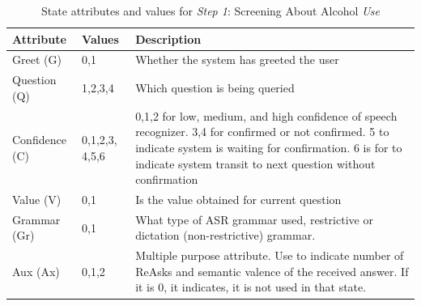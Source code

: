 \begin{sloppy}
\begin{table}[h]

\caption{State attributes and values for {\em Step 1}: Screening About Alcohol {\em Use}}
\label{Features}
\begin{tabular}{ | p{20mm} | p{10mm} | p{47mm} | } \hline
    \textbf{Attribute} & \textbf{Values} & \textbf{Description} \\
    \hline
    Greet (G) & 0,1 & Whether the system has greeted the user \\
    \hline
    Question (Q) & 1,2,3,4 & Which question is being queried \\
    \hline
    Confidence (C) & 0,1,2,3, 4,5,6 & 0,1,2 for low, medium, and high confidence of speech recognizer. 3,4 for confirmed or not confirmed. 5 to indicate system is waiting for confirmation. 6 is for to indicate system transit to next question without confirmation \\
    \hline
  Value (V) & 0,1 & Is the value obtained for current question \\
  \hline
  Grammar (Gr) & 0,1 & What type of ASR grammar used, restrictive or dictation (non-restrictive) grammar.  \\
    \hline
      Aux (Ax) & 0,1,2 & Multiple purpose attribute. Use to indicate number of ReAsks and semantic valence of the received answer. If it is 0, it indicates, it is not used in that state.  \\
        \hline
\end{tabular}
\end{table}


\end{sloppy}
